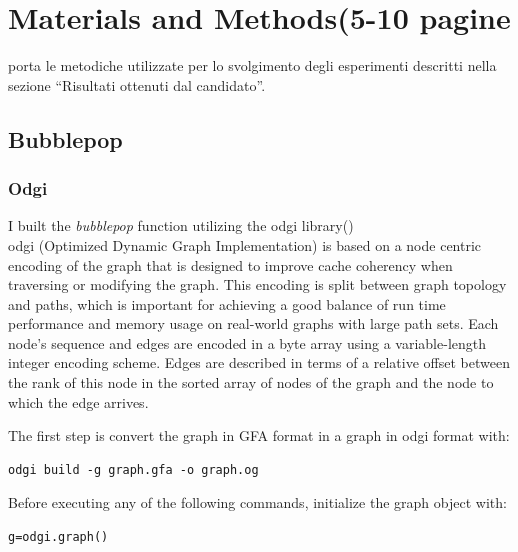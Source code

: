 
\chapter{Materials and Methods(5-10 pagine} %

\label{Chapter7} %

porta le metodiche utilizzate per lo svolgimento degli esperimenti descritti nella sezione “Risultati ottenuti dal candidato”.


\section{Bubblepop} 
\subsection{Odgi}

I built the \textit{bubblepop} function utilizing the odgi library(\cite{eizenga2020succinct})\\

odgi (Optimized Dynamic Graph Implementation) is based on a node centric encoding of the graph that is designed to improve cache coherency when traversing or modifying the graph. This encoding is split between graph topology and paths, which is important for achieving a good balance of run time performance and memory usage on real-world graphs with large path sets. Each node’s sequence and edges are encoded in a byte array using a variable-length integer encoding scheme. Edges are described in terms of a relative offset between the rank of this node in the sorted array of nodes of the graph and the node to which the edge arrives.

The first step is convert the graph in GFA format in a graph in odgi format with:

\begin{verbatim}
odgi build -g graph.gfa -o graph.og
\end{verbatim}

Before executing any of the following commands, initialize the graph object with:

\begin{verbatim}
g=odgi.graph()
\end{verbatim}

